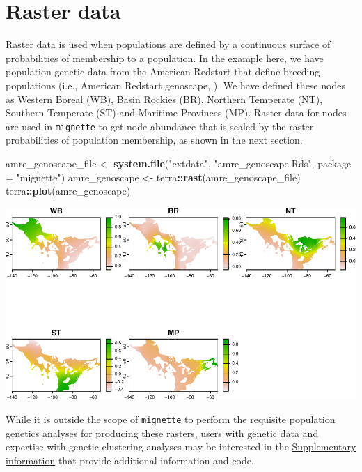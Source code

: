 \documentclass[
]{book}
\newenvironment{Shaded}{\begin{snugshade}}{\end{snugshade}}
\newcommand{\AttributeTok}[1]{\textcolor[rgb]{0.13,0.29,0.53}{#1}}
\newcommand{\FunctionTok}[1]{\textcolor[rgb]{0.13,0.29,0.53}{\textbf{#1}}}
\newcommand{\NormalTok}[1]{#1}
\newcommand{\OtherTok}[1]{\textcolor[rgb]{0.56,0.35,0.01}{#1}}
\newcommand{\SpecialCharTok}[1]{\textcolor[rgb]{0.81,0.36,0.00}{\textbf{#1}}}
\newcommand{\StringTok}[1]{\textcolor[rgb]{0.31,0.60,0.02}{#1}}
\begin{document}
\hypertarget{raster-data}{%
\section{Raster data}\label{raster-data}}

Raster data is used when populations are defined by a continuous surface of probabilities of membership to a population. In the example here, we have population genetic data from the American Redstart that define breeding populations (i.e., American Redstart genoscape, \citep{desaix2023low}). We have defined these nodes as Western Boreal (WB), Basin Rockies (BR), Northern Temperate (NT), Southern Temperate (ST) and Maritime Provinces (MP). Raster data for nodes are used in \texttt{mignette} to get node abundance that is scaled by the raster probabilities of population membership, as shown in the next section.

\begin{Shaded}
\begin{Highlighting}[]
\NormalTok{amre\_genoscape\_file }\OtherTok{\textless{}{-}} \FunctionTok{system.file}\NormalTok{(}\StringTok{"extdata"}\NormalTok{, }\StringTok{"amre\_genoscape.Rds"}\NormalTok{, }\AttributeTok{package =} \StringTok{"mignette"}\NormalTok{)}
\NormalTok{amre\_genoscape }\OtherTok{\textless{}{-}}\NormalTok{ terra}\SpecialCharTok{::}\FunctionTok{rast}\NormalTok{(amre\_genoscape\_file)}
\NormalTok{terra}\SpecialCharTok{::}\FunctionTok{plot}\NormalTok{(amre\_genoscape)}
\end{Highlighting}
\end{Shaded}

\includegraphics{Mignette_files/figure-latex/unnamed-chunk-16-1.pdf}

While it is outside the scope of \texttt{mignette} to perform the requisite population genetics analyses for producing these rasters, users with genetic data and expertise with genetic clustering analyses may be interested in the \protect\hyperlink{supplemental}{Supplementary information} that provide additional information and code.
\end{document}
